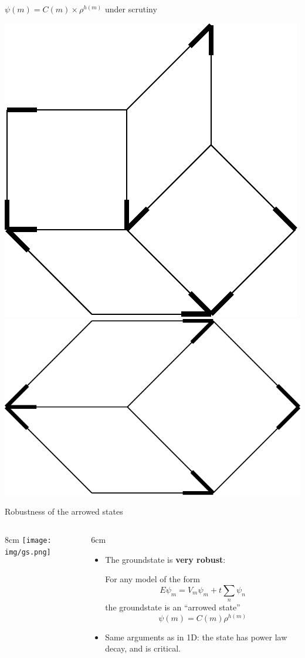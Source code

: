\documentclass[xcolor=x11names,compress,professionalfonts, aspectratio=169]{beamer}
\renewcommand{\(}{\begin{columns}}
\renewcommand{\)}{\end{columns}}
\newcommand{\<}[1]{\begin{column}{#1}}
\renewcommand{\>}{\end{column}}
\begin{document}
\begin{frame}{$\psi(m) = C(m) \times \rho^{h(m)}$ under scrutiny}
{\includegraphics[scale=\s]{img/env_E.pdf}
\includegraphics[scale=\s]{img/env_F.pdf}

}
\end{frame}

\begin{frame}{Robustness of the arrowed states}

\begin{columns}
\<{8cm}
\texttt{[image: img/gs.png]}
\>
\<{6cm}
\begin{itemize}
\item The groundstate is \textbf{very robust}: 

For any model of the form
\[
	E \psi_m = V_m \psi_m + t\sum_{n} \psi_n
\]
the groundstate is an ``arrowed state''
\[
  \psi(m) = C(m) \rho^{h(m)}
\]
\item Same arguments as in 1D: the state has power law decay, and is critical.
\end{itemize}
\>
\end{columns}
\end{frame}
\end{document}

